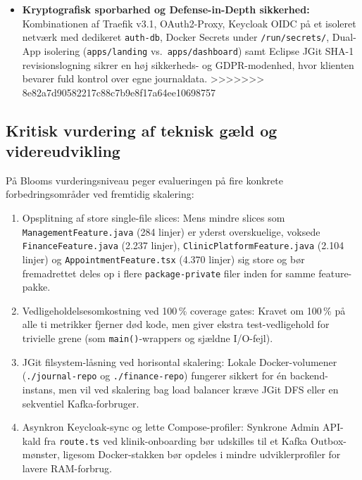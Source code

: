 \documentclass[11pt,a4paper]{article}
\begin{document}
\begin{table}[htbp]
\begin{itemize}[noitemsep]
    \item \textbf{Kryptografisk sporbarhed og Defense-in-Depth sikkerhed:} Kombinationen af Traefik v3.1, OAuth2-Proxy, Keycloak OIDC på et isoleret netværk med dedikeret \texttt{auth-db}, Docker Secrets under \texttt{/run/secrets/}, Dual-App isolering (\texttt{apps/landing} vs.\ \texttt{apps/dashboard}) samt Eclipse JGit SHA-1 revisionslogning sikrer en høj sikkerheds- og GDPR-modenhed, hvor klienten bevarer fuld kontrol over egne journaldata.
>>>>>>> 8e82a7d90582217c88c7b9e8f17a64ee10698757
\end{itemize}

\subsection{Kritisk vurdering af teknisk gæld og videreudvikling}
På Blooms vurderingsniveau \cite{bloom1956} peger evalueringen på fire konkrete forbedringsområder ved fremtidig skalering:
\begin{enumerate}[noitemsep]
    \item Opsplitning af store single-file slices: Mens mindre slices som \texttt{ManagementFeature.java} (284 linjer) er yderst overskuelige, voksede \texttt{FinanceFeature.java} (2.237 linjer), \texttt{ClinicPlatformFeature.java} (2.104 linjer) og \texttt{AppointmentFeature.tsx} (4.370 linjer) sig store og bør fremadrettet deles op i flere \texttt{package-private} filer inden for samme feature-pakke.
    \item Vedligeholdelsesomkostning ved 100\,\% coverage gates: Kravet om 100\,\% på alle ti metrikker fjerner død kode, men giver ekstra test-vedligehold for trivielle grene (som \texttt{main()}-wrappers og sjældne I/O-fejl).
    \item JGit filsystem-låsning ved horisontal skalering: Lokale Docker-volumener (\texttt{./journal-repo} og \texttt{./finance-repo}) fungerer sikkert for én backend-instans, men vil ved skalering bag load balancer kræve JGit DFS eller en sekventiel Kafka-forbruger.
    \item Asynkron Keycloak-sync og lette Compose-profiler: Synkrone Admin API-kald fra \texttt{route.ts} ved klinik-onboarding bør udskilles til et Kafka Outbox-mønster, ligesom Docker-stakken bør opdeles i mindre udviklerprofiler for lavere RAM-forbrug.
\end{enumerate}

\newpage

\end{table}
\end{document}
